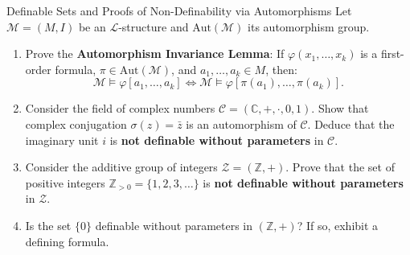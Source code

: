 \begin{exercise}{Definable Sets and Proofs of Non-Definability via Automorphisms}
Let $\mathcal{M} = (M, I)$ be an $\mathcal{L}$-structure and $\mathrm{Aut}(\mathcal{M})$ its automorphism group.
\begin{enumerate}[leftmargin=1.5em,itemsep=2pt]
  \item Prove the \textbf{Automorphism Invariance Lemma}: If $\varphi(x_1, \dots, x_k)$ is a first-order formula, $\pi \in \mathrm{Aut}(\mathcal{M})$, and $a_1, \dots, a_k \in M$, then:
  \[
  \mathcal{M} \models \varphi[a_1, \dots, a_k] \iff \mathcal{M} \models \varphi[\pi(a_1), \dots, \pi(a_k)].
  \]
  \item Consider the field of complex numbers $\mathcal{C} = (\mathbb{C}, +, \cdot, 0, 1)$.
  Show that complex conjugation $\sigma(z) = \bar{z}$ is an automorphism of $\mathcal{C}$.
  Deduce that the imaginary unit $i$ is \textbf{not definable without parameters} in $\mathcal{C}$.
  \item Consider the additive group of integers $\mathcal{Z} = (\mathbb{Z}, +)$.
  Prove that the set of positive integers $\mathbb{Z}_{> 0} = \{1, 2, 3, \dots\}$ is \textbf{not definable without parameters} in $\mathcal{Z}$.
  \item Is the set $\{0\}$ definable without parameters in $(\mathbb{Z}, +)$? If so, exhibit a defining formula.
\end{enumerate}
\end{exercise}

\begin{tabletworkspace}[5.0cm]
\end{tabletworkspace}

